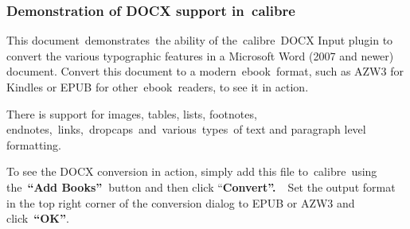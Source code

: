 \documentclass[\officeparserdriver aspectratio=169,12pt,xcolor=table]{beamer}
\begin{document}
\begin{frame}[allowframebreaks]
\frametitle{\protect\textcolor{hex17365D}{Demonstration of DOCX support in~calibre}}
\label{demonstration-of-docx-support-in-calibre}
\textcolor{hex000000}{This document~demonstrates~the ability of the~calibre~DOCX Input plugin to convert the various typographic features in a Microsoft Word (2007 and newer) document. Convert this document to a modern~ebook~format, such as AZW3 for Kindles or EPUB for other~ebook~readers, to see it in action.}

\textcolor{hex000000}{There is support for images, tables, lists, footnotes, endnotes,~links,~dropcaps~and~various~types~of text and paragraph level formatting.}

\textcolor{hex000000}{To see the DOCX conversion in action, simply add this file to~calibre~using the~}\textcolor{hex000000}{\textbf{“Add Books”~}}\textcolor{hex000000}{button and then click “}\textcolor{hex000000}{\textbf{Convert”.~}}\textcolor{hex000000}{~Set the output format in the top right corner of the conversion dialog to EPUB or AZW3 and click~}\textcolor{hex000000}{\textbf{“OK”}}\textcolor{hex000000}{.}
\end{frame}
\end{document}
